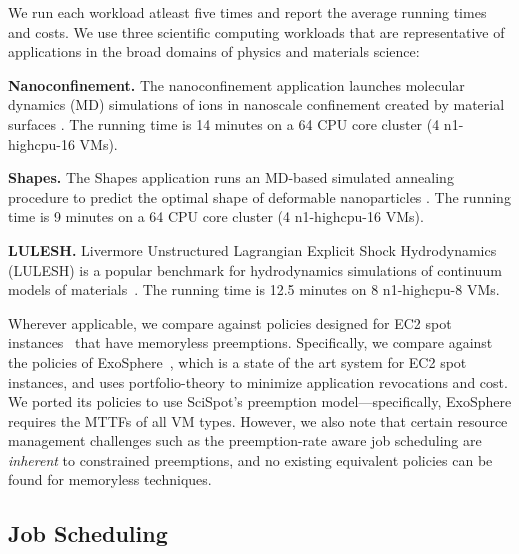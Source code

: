 \documentclass[compsoc]{IEEEtran}
\newcommand{\subsecspace}[0]{-0.20cm}
\begin{document}
We run each workload atleast five times and report the average running times and costs. 
We use three scientific computing workloads that are representative of  applications in the broad domains of physics and materials science:


\noindent \textbf{Nanoconfinement.}
The nanoconfinement application launches molecular dynamics (MD) simulations of ions in nanoscale confinement created by material surfaces \cite{jing2015ionic,kadupitiya2017,anousheh2020ionic}. The running time is 14 minutes on a 64 CPU core cluster (4 n1-highcpu-16 VMs). 

\noindent \textbf{Shapes.} The Shapes application runs an MD-based simulated annealing procedure to predict the optimal shape of deformable nanoparticles \cite{jto1,brunk2019computational,brunk2020}. The running time is 9 minutes on a 64 CPU core cluster (4 n1-highcpu-16 VMs). 

\noindent \textbf{LULESH.} Livermore Unstructured Lagrangian Explicit Shock Hydrodynamics (LULESH) is a popular benchmark 
for hydrodynamics simulations of continuum models of materials~\cite{IPDPS13:LULESH,LULESH2:changes}. The running time is 12.5 minutes on 8 n1-highcpu-8 VMs.










Wherever applicable, we compare against policies designed for EC2 spot instances~\cite{harlap2018tributary, spoton} that have memoryless preemptions.
Specifically, we compare against the policies of ExoSphere~\cite{exosphere}, which is a state of the art system for EC2 spot instances, and uses portfolio-theory to minimize application revocations and cost.
We ported its policies to use SciSpot's preemption model---specifically, ExoSphere requires the MTTFs of all VM types. 
However, we also note that certain resource management challenges such as the preemption-rate aware job scheduling are \emph{inherent} to constrained preemptions, and no existing equivalent policies can be found for memoryless techniques. 



\vspace*{\subsecspace}
\subsection{Job Scheduling}
\label{subsec:eval-sched}
\end{document}

